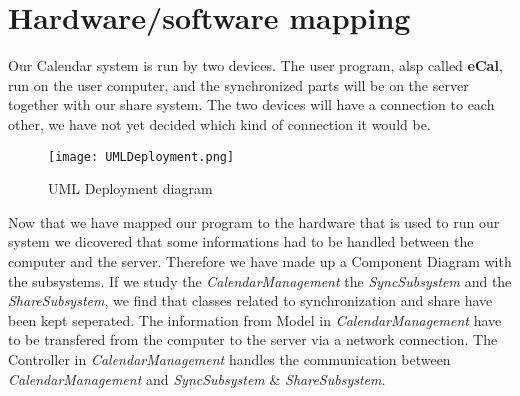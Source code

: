 \section{Hardware/software mapping}

Our Calendar system is run by two devices. The user program, alsp called \textbf{eCal}, run on the user computer, and the synchronized parts will be on the server together with our share system. The two devices will have a connection to each other, we have not yet decided which kind of connection it would be.

\begin{figure}[h]
\centering
\texttt{[image: UMLDeployment.png]}
\caption{UML Deployment diagram \label{overflow}}
\label{figur:UMLDeployment}
\end{figure}

Now that we have mapped our program to the hardware that is used to run our system we dicovered that some informations had to be handled between the computer and the server. Therefore we have made up a Component Diagram with the subsystems. If we study the \textit{CalendarManagement} the \textit{SyncSubsystem} and the \textit{ShareSubsystem}, we find that classes related to synchronization and share have been kept seperated. The information from Model in \textit{CalendarManagement} have to be transfered from the computer to the server via a network connection. The Controller in \textit{CalendarManagement} handles the communication between \textit{CalendarManagement} and \textit{SyncSubsystem} \& \textit{ShareSubsystem}.